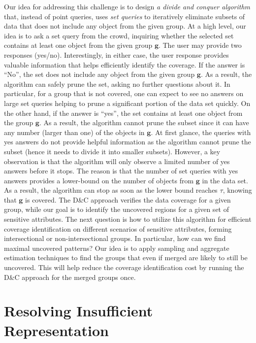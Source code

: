 \documentclass[11pt]{article}
\newcommand{\gee}{\mathbf{g}}
\begin{document}
Our idea for addressing this challenge is to
design {\it a divide and conquer algorithm} that, instead of {point queries}, uses {\it set queries} to iteratively eliminate subsets of data that {does not include any object from the given group}.
At a high level, our idea is to ask a set query from the crowd, inquiring whether the selected set contains at least one object from the given group $\gee$.
The user may provide two responses (yes/no). 
Interestingly, {in either case}, the user response provides valuable information that helps efficiently identify the coverage.
If the answer is ``No'', the set does not include any object from the given group $\gee$. As a result, the algorithm can safely prune the set, asking no further questions about it. In particular, for a group that is not covered, one can expect to see no answers on large set queries helping to prune a significant portion of the data set quickly.
On the other hand, if the answer is ``yes'', the set contains {at least} one object from the group $\gee$. As a result, the algorithm cannot prune the subset since it can have any number (larger than one) of the objects in $\gee$.
At first glance, the queries with yes answers do not provide helpful information as the algorithm cannot prune the subset (hence it needs to divide it into smaller subsets).
However, a key observation is that {the algorithm will only observe a limited number of yes answers} before it stops.
The reason is that the number of set queries with yes answers provides a {lower-bound} on the number of objects from $\gee$ in the data set. As a result, the algorithm can stop as soon as the lower bound reaches $\tau$, knowing that $\gee$ is covered.
The D\&C approach verifies the data coverage for a given group, while our goal is to identify the uncovered regions for a given set of sensitive attributes. The next question is how to utilize this algorithm for efficient coverage identification on different scenarios of sensitive attributes, forming intersectional or non-intersectional groups.
In particular, how can we find maximal uncovered patterns?
Our idea is to apply sampling and aggregate estimation techniques to find the groups that even if merged are likely to still be uncovered. This will help reduce the coverage identification cost by running the D\&C approach for the merged groups once.
\section{Resolving Insufficient Representation}\label{sec:resolution}
\end{document}
